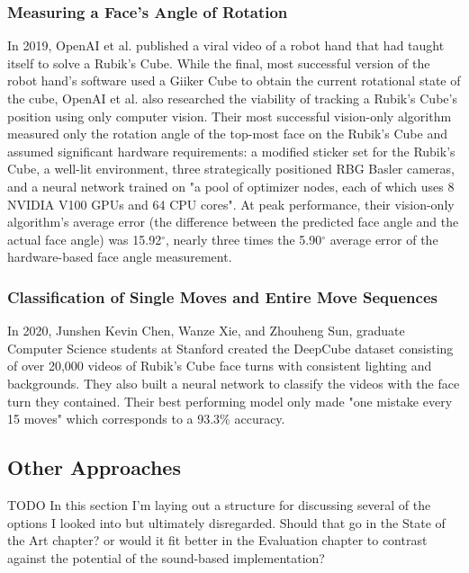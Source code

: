 \subsubsection{Measuring a Face's Angle of Rotation}
In 2019, OpenAI et al. published a viral video of a robot hand that had taught itself to solve a Rubik's Cube.
While the final, most successful version of the robot hand's software used a Giiker Cube to obtain the current rotational state of the cube, OpenAI et al. also researched the viability of tracking a Rubik's Cube's position using only computer vision.
Their most successful vision-only algorithm measured only the rotation angle of the top-most face on the Rubik's Cube and assumed significant hardware requirements: a modified sticker set for the Rubik's Cube, a well-lit environment, three strategically positioned RBG Basler cameras, and a neural network trained on "a pool of optimizer nodes, each of which uses 8 NVIDIA V100 GPUs and 64 CPU cores".
At peak performance, their vision-only algorithm's average error (the difference between the predicted face angle and the actual face angle) was 15.92$^\circ$, nearly three times the 5.90$^\circ$ average error of the hardware-based face angle measurement. \cite{openai2019rubiks}

\subsubsection{Classification of Single Moves and Entire Move Sequences}
In 2020, Junshen Kevin Chen, Wanze Xie, and Zhouheng Sun, graduate Computer Science students at Stanford created the DeepCube dataset consisting of over 20,000 videos of Rubik's Cube face turns with consistent lighting and backgrounds. 
They also built a neural network to classify the videos with the face turn they contained.
Their best performing model only made "one mistake every 15 moves" which corresponds to a 93.3\% accuracy. \cite{chen-deep-cube-dataset}


\subsection{Other Approaches}

TODO In this section I'm laying out a structure for discussing several of the options I looked into but ultimately disregarded. Should that go in the State of the Art chapter? or would it fit better in the Evaluation chapter to contrast against the potential of the sound-based implementation?

